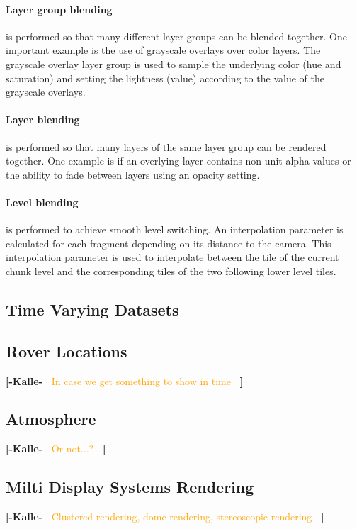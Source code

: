 \documentclass[journal]{vgtc}                %
\newcommand{\kallecomment}[1]{\textbf{[-Kalle-~}
    \textcolor{orange}{#1}
    \textbf{~]}}
\begin{document}
\paragraph{Layer group blending} is performed so that many different layer groups can be blended together.
One important example is the use of grayscale overlays over color layers.
The grayscale overlay layer group is used to sample the underlying color (hue and saturation) and setting the lightness (value) according to the value of the grayscale overlays.

\paragraph{Layer blending} is performed so that many layers of the same layer group can be rendered together.
One example is if an overlying layer contains non unit alpha values or the ability to fade between layers using an opacity setting.

\paragraph{Level blending} is performed to achieve smooth level switching.
An interpolation parameter is calculated for each fragment depending on its distance to the camera.
This interpolation parameter is used to interpolate between the tile of the current chunk level and the corresponding tiles of the two following lower level tiles.

\subsection{Time Varying Datasets}

\subsection{Rover Locations}
\kallecomment{In case we get something to show in time}

\subsection{Atmosphere}
\kallecomment{Or not...?}

\subsection{Milti Display Systems Rendering}
\kallecomment{Clustered rendering, dome rendering, stereoscopic rendering}
\end{document}
